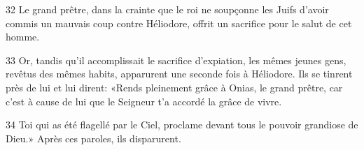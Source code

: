 
32 Le grand prêtre, dans la crainte que le roi ne soupçonne les Juifs d’avoir commis un mauvais coup contre Héliodore, offrit un sacrifice pour le salut de cet homme.

33 Or, tandis qu’il accomplissait le sacrifice d’expiation, les mêmes jeunes gens, revêtus des mêmes habits, apparurent une seconde fois à Héliodore. Ils se tinrent près de lui et lui dirent: «Rends pleinement grâce à Onias, le grand prêtre, car c’est à cause de lui que le Seigneur t’a accordé la grâce de vivre.

34 Toi qui as été flagellé par le Ciel, proclame devant tous le pouvoir grandiose de Dieu.» Après ces paroles, ils disparurent.